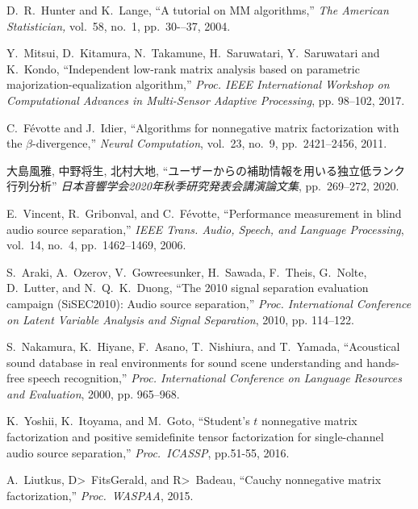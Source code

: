 \documentclass[honka]{nitkagawathesis}%
\begin{document}
\begin{thebibliography}{99}
  D.~R.~Hunter and K.~Lange, ``A tutorial on MM algorithms,'' 
  {\em The American Statistician,} vol.~58, no.~1, pp.~30-–37, 2004.
  
  Y.~Mitsui, D.~Kitamura, N.~Takamune, H.~Saruwatari, Y.~Saruwatari and K.~Kondo, ``Independent low-rank matrix analysis based on parametric majorization-equalization algorithm,'' 
  {\em Proc. IEEE International Workshop on Computational Advances in Multi-Sensor Adaptive Processing}, pp. 98--102, 2017.
  
  C.~Févotte and J.~Idier, 
  ``Algorithms for nonnegative matrix factorization with the $\beta$-divergence,'' 
  {\em Neural Computation}, vol.~23, no.~9, pp.~2421--2456, 2011.
  
  大島風雅, 中野将生, 北村大地,
  ``ユーザーからの補助情報を用いる独立低ランク行列分析''
  {\em 日本音響学会2020年秋季研究発表会講演論文集}, pp.~269--272, 2020.
  
  E.~Vincent, R.~Gribonval, and C.~F\'evotte, ``Performance measurement in blind audio source separation,'' 
  {\em IEEE Trans. Audio, Speech, and Language Processing}, vol.~14, no.~4, pp.~1462--1469, 2006.
  
  S.~Araki, A.~Ozerov, V.~Gowreesunker, H.~Sawada, F.~Theis, G.~Nolte, D.~Lutter, and N.~Q.~K.~Duong, 
  ``The 2010 signal separation evaluation campaign (SiSEC2010): Audio source separation,'' 
  {\em Proc. International Conference on Latent Variable Analysis and Signal Separation}, 2010, pp. 114–122.
  
  S.~Nakamura, K.~Hiyane, F.~Asano, T.~Nishiura, and T.~Yamada, 
  ``Acoustical sound database in real environments for sound scene understanding and hands-free speech recognition,'' 
  {\em Proc. International Conference on Language Resources and Evaluation}, 2000, pp. 965–968.

  K.~Yoshii, K.~Itoyama, and M.~Goto, ``Student's $t$ nonnegative matrix factorization and positive semidefinite tensor    
  factorization for single-channel audio source separation,''
  {\em Proc.~ICASSP}, pp.51-55, 2016.

  A.~Liutkus, D>~FitsGerald, and R>~Badeau, ``Cauchy nonnegative matrix factorization,''
  {\em Proc.~WASPAA}, 2015.

\end{thebibliography}
% 

%

\appendix

%
\end{document}
